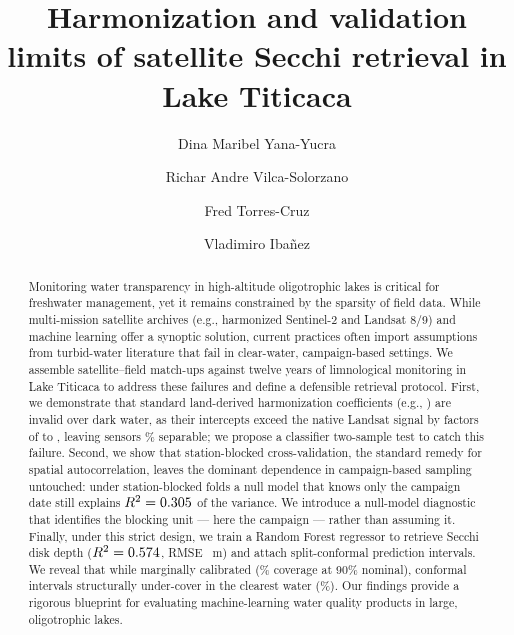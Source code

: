 \documentclass[preprint,review,12pt,authoryear]{elsarticle}
\begin{document}
\begin{frontmatter}

\title{Harmonization and validation limits of satellite Secchi retrieval in
Lake Titicaca}

\author[unap]{Dina Maribel Yana-Yucra}
\author[unap]{Richar Andre Vilca-Solorzano}
\author[unap]{Fred Torres-Cruz}
\author[unap]{Vladimiro Iba\~nez}

\begin{abstract}
Monitoring water transparency in high-altitude oligotrophic lakes is critical for freshwater management, yet it remains constrained by the sparsity of field data. While multi-mission satellite archives (e.g., harmonized Sentinel-2 and Landsat 8/9) and machine learning offer a synoptic solution, current practices often import assumptions from turbid-water literature that fail in clear-water, campaign-based settings. We assemble \numMatchupsTotal{} satellite--field match-ups against twelve years of limnological monitoring in Lake Titicaca to address these failures and define a defensible retrieval protocol. First, we demonstrate that standard land-derived harmonization coefficients (e.g., \citealp{Roy2016}) are invalid over dark water, as their intercepts exceed the native Landsat signal by factors of \numRoyRatioGreen{} to \numRoyRatioNir{}, leaving sensors \numSensorAccAll\% separable; we propose a classifier two-sample test to catch this failure. Second, we show that station-blocked cross-validation, the standard remedy for spatial autocorrelation, leaves the dominant dependence in campaign-based sampling untouched: under station-blocked folds a null model that knows only the campaign date still explains $R^2=0.305$ of the variance. We introduce a null-model diagnostic that identifies the blocking unit --- here the campaign --- rather than assuming it. Finally, under this strict design, we train a Random Forest regressor to retrieve Secchi disk depth ($R^2=0.574$, RMSE \numHeadlineRmse~m) and attach split-conformal prediction intervals. We reveal that while marginally calibrated (\numConformalCovNineZero\% coverage at 90\% nominal), conformal intervals structurally under-cover in the clearest water (\numConformalCovClearest\%). Our findings provide a rigorous blueprint for evaluating machine-learning water quality products in large, oligotrophic lakes.
\end{abstract}


\end{frontmatter}
\end{document}
